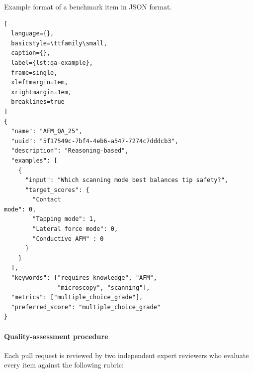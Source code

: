 \begin{hypobox}{Example format of a benchmark item in JSON format.}
  \begin{lstlisting}[
  language={},
  basicstyle=\ttfamily\small,
  caption={},
  label={lst:qa-example},
  frame=single,
  xleftmargin=1em,
  xrightmargin=1em,
  breaklines=true
]
{
  "name": "AFM_QA_25",
  "uuid": "5f17549c-7bf4-4eb6-a547-7274c7dddcb3",
  "description": "Reasoning-based",
  "examples": [
    {
      "input": "Which scanning mode best balances tip safety?",
      "target_scores": {
        "Contact
mode": 0,
        "Tapping mode": 1,
        "Lateral force mode": 0,
        "Conductive AFM" : 0
      }
    }
  ],
  "keywords": ["requires_knowledge", "AFM", 
               "microscopy", "scanning"],
  "metrics": ["multiple_choice_grade"],
  "preferred_score": "multiple_choice_grade"
}
\end{lstlisting}
\end{hypobox}



\paragraph{Quality-assessment procedure}
\label{par:qa-rubric}

Each pull request is reviewed by two independent expert reviewers who evaluate every item against the following rubric:
 
